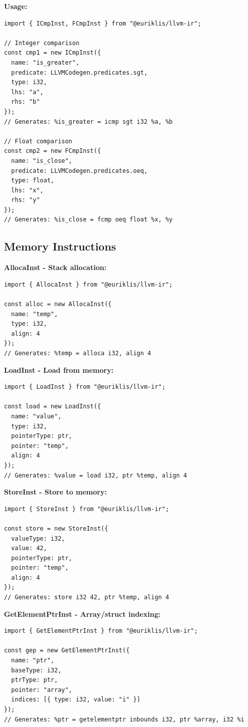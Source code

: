 \documentclass[11pt]{article}
\begin{document}
\textbf{Usage:}
\begin{lstlisting}[style=ts]
import { ICmpInst, FCmpInst } from "@euriklis/llvm-ir";

// Integer comparison
const cmp1 = new ICmpInst({
  name: "is_greater",
  predicate: LLVMCodegen.predicates.sgt,
  type: i32,
  lhs: "a",
  rhs: "b"
});
// Generates: %is_greater = icmp sgt i32 %a, %b

// Float comparison
const cmp2 = new FCmpInst({
  name: "is_close",
  predicate: LLVMCodegen.predicates.oeq,
  type: float,
  lhs: "x",
  rhs: "y"
});
// Generates: %is_close = fcmp oeq float %x, %y
\end{lstlisting}

\subsection{Memory Instructions}

\textbf{AllocaInst - Stack allocation:}
\begin{lstlisting}[style=ts]
import { AllocaInst } from "@euriklis/llvm-ir";

const alloc = new AllocaInst({
  name: "temp",
  type: i32,
  align: 4
});
// Generates: %temp = alloca i32, align 4
\end{lstlisting}

\textbf{LoadInst - Load from memory:}
\begin{lstlisting}[style=ts]
import { LoadInst } from "@euriklis/llvm-ir";

const load = new LoadInst({
  name: "value",
  type: i32,
  pointerType: ptr,
  pointer: "temp",
  align: 4
});
// Generates: %value = load i32, ptr %temp, align 4
\end{lstlisting}

\textbf{StoreInst - Store to memory:}
\begin{lstlisting}[style=ts]
import { StoreInst } from "@euriklis/llvm-ir";

const store = new StoreInst({
  valueType: i32,
  value: 42,
  pointerType: ptr,
  pointer: "temp",
  align: 4
});
// Generates: store i32 42, ptr %temp, align 4
\end{lstlisting}

\textbf{GetElementPtrInst - Array/struct indexing:}
\begin{lstlisting}[style=ts]
import { GetElementPtrInst } from "@euriklis/llvm-ir";

const gep = new GetElementPtrInst({
  name: "ptr",
  baseType: i32,
  ptrType: ptr,
  pointer: "array",
  indices: [{ type: i32, value: "i" }]
});
// Generates: %ptr = getelementptr inbounds i32, ptr %array, i32 %i
\end{lstlisting}
\end{document}
